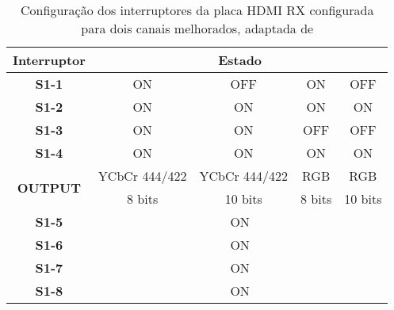 \begin{table}[h!]
	\centering

	\begin{tabular}{|c|c|c|c|c|}
		\hline
		\textbf{Interruptor}             & \multicolumn{4}{c|}{\textbf{Estado}}             \\ \hline
		\textbf{S1-1}                    & ON            & OFF           & ON     & OFF     \\ \hline
		\textbf{S1-2}                    & ON            & ON            & ON     & ON      \\ \hline
		\textbf{S1-3}                    & ON            & ON            & OFF    & OFF     \\ \hline
		\textbf{S1-4}                    & ON            & ON            & ON     & ON      \\ \hline
		\multirow{2}{*}{\textbf{OUTPUT}} & YCbCr 444/422 & YCbCr 444/422 & RGB    & RGB     \\ \cline{2-5} 
		& 8 bits        & 10 bits       & 8 bits & 10 bits \\ \hline
		\textbf{S1-5}                    & \multicolumn{4}{c|}{ON}                          \\ \hline
		\textbf{S1-6}                    & \multicolumn{4}{c|}{ON}                          \\ \hline
		\textbf{S1-7}                    & \multicolumn{4}{c|}{ON}                          \\ \hline
		\textbf{S1-8}                    & \multicolumn{4}{c|}{ON}                          \\ \hline
	\end{tabular}
	\caption{Configuração dos interruptores da placa HDMI RX configurada para dois canais melhorados, adaptada de \cite{R013}}
	\label{table:HDMI_2ch_melhoradp_RX}
\end{table}

